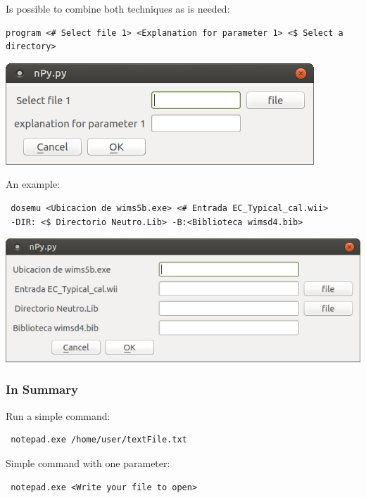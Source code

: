 \documentclass[a4paper,10pt]{article}
\begin{document}
\noindent Is possible to combine both techniques as is needed:

\begin{verbatim}
program <# Select file 1> <Explanation for parameter 1> <$ Select a directory>
 \end{verbatim}

 \begin{center}
 \includegraphics[width=\textwidth]{img/contextMenuExampleCombined.png}
\end{center}

\noindent An example:

\begin{verbatim}
 dosemu <Ubicacion de wims5b.exe> <# Entrada EC_Typical_cal.wii> 
 -DIR: <$ Directorio Neutro.Lib> -B:<Biblioteca wimsd4.bib>
 \end{verbatim}

\begin{center}
 \includegraphics[width=\textwidth]{img/contextMenuCombined.png}
\end{center}

\subsubsection{In Summary}

\noindent Run a simple command: 
\begin{verbatim} notepad.exe /home/user/textFile.txt\end{verbatim}

\noindent Simple command with one parameter:

\begin{verbatim} notepad.exe <Write your file to open>\end{verbatim}
\end{document}
